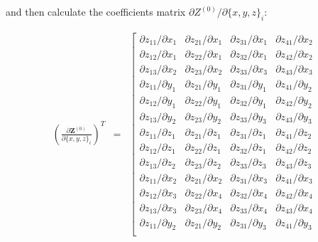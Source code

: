 \documentclass{article}
\begin{document}
\noindent and then calculate the coefficients matrix 
$\partial{Z^{(0)}} / \partial{\{x, y, z\}_i}$:

\begin{eqnarray}
\left(\frac{\partial{\mathbf{Z}^{(0)}}}{\partial{\{x, y, z\}_i}}\right)^T
& = &
\left[\begin{array}{cccc}
\partial{z_{11}} / \partial{x_1} & \partial{z_{21}} / \partial{x_1} &
\partial{z_{31}} / \partial{x_1} & \partial{z_{41}} / \partial{x_2} \\
\partial{z_{12}} / \partial{x_1} & \partial{z_{22}} / \partial{x_1} &
\partial{z_{32}} / \partial{x_1} & \partial{z_{42}} / \partial{x_2} \\
\partial{z_{13}} / \partial{x_2} & \partial{z_{23}} / \partial{x_2} &
\partial{z_{33}} / \partial{x_3} & \partial{z_{43}} / \partial{x_3} \\
\partial{z_{11}} / \partial{y_1} & \partial{z_{21}} / \partial{y_1} &
\partial{z_{31}} / \partial{y_1} & \partial{z_{41}} / \partial{y_2} \\
\partial{z_{12}} / \partial{y_1} & \partial{z_{22}} / \partial{y_1} &
\partial{z_{32}} / \partial{y_1} & \partial{z_{42}} / \partial{y_2} \\
\partial{z_{13}} / \partial{y_2} & \partial{z_{23}} / \partial{y_2} &
\partial{z_{33}} / \partial{y_3} & \partial{z_{43}} / \partial{y_3} \\
\partial{z_{11}} / \partial{z_1} & \partial{z_{21}} / \partial{z_1} &
\partial{z_{31}} / \partial{z_1} & \partial{z_{41}} / \partial{z_2} \\
\partial{z_{12}} / \partial{z_1} & \partial{z_{22}} / \partial{z_1} &
\partial{z_{32}} / \partial{z_1} & \partial{z_{42}} / \partial{z_2} \\
\partial{z_{13}} / \partial{z_2} & \partial{z_{23}} / \partial{z_2} &
\partial{z_{33}} / \partial{z_3} & \partial{z_{43}} / \partial{z_3} \\
\partial{z_{11}} / \partial{x_2} & \partial{z_{21}} / \partial{x_2} &
\partial{z_{31}} / \partial{x_3} & \partial{z_{41}} / \partial{x_3} \\
\partial{z_{12}} / \partial{x_3} & \partial{z_{22}} / \partial{x_4} &
\partial{z_{32}} / \partial{x_4} & \partial{z_{42}} / \partial{x_4} \\
\partial{z_{13}} / \partial{x_3} & \partial{z_{23}} / \partial{x_4} &
\partial{z_{33}} / \partial{x_4} & \partial{z_{43}} / \partial{x_4} \\
\partial{z_{11}} / \partial{y_2} & \partial{z_{21}} / \partial{y_2} &
\partial{z_{31}} / \partial{y_3} & \partial{z_{41}} / \partial{y_3} \\

\end{array}
\end{eqnarray}
\end{document}
